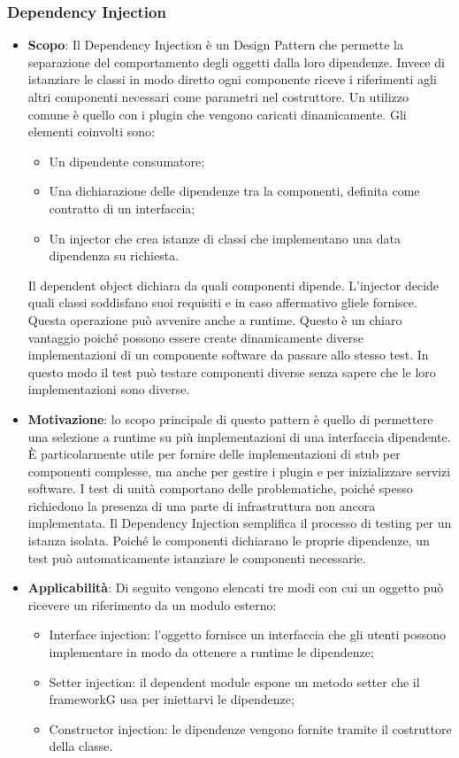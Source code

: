 		\subsubsection{Dependency Injection}
		\begin{itemize}
		\item \textbf{Scopo}: Il Dependency Injection è un Design Pattern che permette la separazione del comportamento degli oggetti dalla loro dipendenze. Invece di istanziare le classi in modo diretto ogni componente riceve i riferimenti agli altri componenti necessari come parametri nel costruttore. Un utilizzo comune è quello con i plugin che vengono caricati dinamicamente. Gli elementi coinvolti sono:
\begin{itemize}
\item Un dipendente consumatore;
\item Una dichiarazione delle dipendenze tra la componenti, definita come contratto di un interfaccia;
\item Un injector che crea istanze di classi che implementano una data dipendenza su richiesta.
\end{itemize}
Il dependent object dichiara da quali componenti dipende. L’injector decide quali classi soddisfano suoi requisiti e in caso affermativo gliele fornisce. Questa operazione può avvenire anche a runtime. Questo è un chiaro vantaggio poiché possono essere create dinamicamente diverse implementazioni di un componente software da passare allo stesso test. In questo modo il test può testare componenti diverse senza sapere che le loro implementazioni sono diverse.
\item \textbf{Motivazione}: lo scopo principale di questo pattern è quello di permettere una selezione a runtime su più implementazioni di una interfaccia dipendente. È particolarmente utile per fornire delle implementazioni di stub per componenti complesse, ma anche per gestire i plugin e per inizializzare servizi software. I test di unità comportano delle problematiche, poiché spesso richiedono la presenza di una parte di infrastruttura non ancora implementata. Il Dependency Injection semplifica il processo di testing per un istanza isolata. Poiché le componenti dichiarano le proprie dipendenze, un test può automaticamente istanziare le componenti necessarie.
\item \textbf{Applicabilità}: Di seguito vengono elencati tre modi con cui un oggetto può ricevere un riferimento da un modulo esterno:
\begin{itemize}
\item Interface injection: l’oggetto fornisce un interfaccia che gli utenti possono implementare
in modo da ottenere a runtime le dipendenze;
\item Setter injection: il dependent module espone un metodo setter che il frameworkG usa per
iniettarvi le dipendenze;
\item Constructor injection: le dipendenze vengono fornite tramite il costruttore della classe.
\end{itemize}

		\end{itemize}
